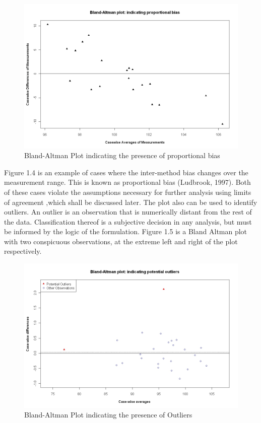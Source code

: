 \documentclass[12pt, a4paper]{report}
\theoremstyle{plain}
\theoremstyle{definition}
\theoremstyle{remark}
\begin{document}
	\begin{figure}[h!]
		\begin{center}
			\includegraphics[width=125mm]{images/PropBias.jpeg}
			\caption{Bland-Altman Plot indicating the presence of proportional bias}\label{PropBias}
		\end{center}
	\end{figure}
	
	\newpage
	Figure 1.4 is an example of cases where the inter-method bias
	changes over the measurement range. This is known as proportional
	bias (Ludbrook, 1997). Both of these cases violate the assumptions
	necessary for further analysis using limits of agreement ,which
	shall be discussed later. The plot also can be used to identify
	outliers. An outlier is an observation that is numerically distant
	from the rest of the data. Classification thereof is a subjective
	decision in any analysis, but must be informed by the logic of the
	formulation. Figure 1.5 is a Bland Altman plot with two
	conspicuous observations, at the extreme left and right of the
	plot respectively.
	
	
	\begin{figure}[h!]
		\begin{center}
			\includegraphics[width=125mm]{images/BAOutliers.jpeg}
			\caption{Bland-Altman Plot indicating the presence of Outliers}\label{PropBias}
		\end{center}
	\end{figure}
	
\end{document}
